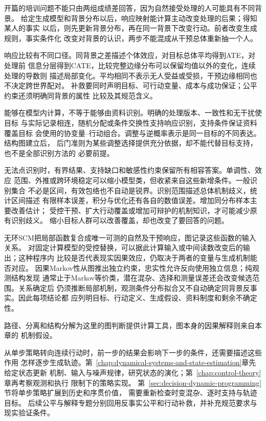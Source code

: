 开篇的培训问题不能只由两组成绩差回答，因为自然接受处理的人可能具有不同背景。
给定生成模型和背景分布以后，响应映射能计算主动改变处理的后果；得知某人的事实
以后，则先更新背景分布，再在同一背景下改变行动。前者改变生成规则，事实条件化
改变对背景的认识，两步不能混成从干预总体重新抽一个人。

响应比较有不同口径。同背景之差描述个体效应，对目标总体平均得到ATE，对处理前
信息分层得到CATE，比较完整边缘分布可以保留均值以外的变化，连续处理的导数则
描述局部变化。平均相同不表示无人受益或受损，干预边缘相同也不决定跨世界配对。
补救要同时声明目标、可行动变量、成本与成功保证；公平约束还须明确同背景的属性
比较及其规范含义。

能够在模型内计算，不等于能够由资料识别。明确的处理版本、一致性和无干扰使目标
与实际记录相连，随机分配或条件交换性支持响应识别，支持条件保证资料覆盖目标
会使用的协变量--行动组合。调整与逆概率表示是同一目标的不同表达。结构图建立后，
后门准则为某些调整选择提供充分依据，却不能代替目标支持，也不是全部识别方法的
必要前提。

无法点识别时，有界结果、支持缺口和敏感性约束保留所有相容答案。单调性、效应
范围、外推或跨环境稳定可以缩小模型类，但收紧来自这些新增条件。一般识别集合
不必是区间，有效包络也不自动是锐界。识别范围描述总体机制歧义，统计区间描述
有限样本误差，积分与优化还有各自的数值误差。增加同分布样本主要改善估计；
受控干预、扩大行动覆盖或增加可辩护的机制知识，才可能减少原有识别歧义。
缩小目标人群可以改善覆盖，却也改变了要回答的问题。

无环SCM把局部函数复合成唯一可测的自然及干预响应，图记录这些函数的输入关系。
对固定计算模型的受控替换，可以据此计算输入或中间读数改变后的输出；这种程序内
比较是否代表现实因果效应，仍取决于两者的变量与生成机制能否对应。
因果Markov性从图推出独立约束，忠实性允许反向使用独立信息；纯观测结构发现
通常止于Markov等价类，潜在混杂、选择和测量误差还会改变候选范围。关系确定后
仍须推断局部机制，观测条件分布拟合又不自动确定同背景反事实。因此每项结论都
应列明目标、行动定义、生成假设、资料制度和剩余不确定性。

路径、分离和结构分解为这里的图判断提供计算工具，图本身的因果解释则来自本章的
机制假设。

从单步策略转向连续行动时，前一步的结果会影响下一步的条件，还需要描述这些作用
怎样逐步生成轨迹。第~\ref{chap:dynamical-systems-and-state-estimation}章先给定状态更新
机制、输入与噪声规律，研究状态的演化；第~\ref{chap:control-theory}章再考察观测和执行
限制下的策略实现。
第~\ref{sec:decision-dynamic-programming}节将单步策略扩展到历史和序贯价值，
需要重新检查时变混杂、逐时支持与轨迹目标。
后续公平与解释专题分别回用反事实公平和行动补救，并补充规范要求与现实验证条件。
